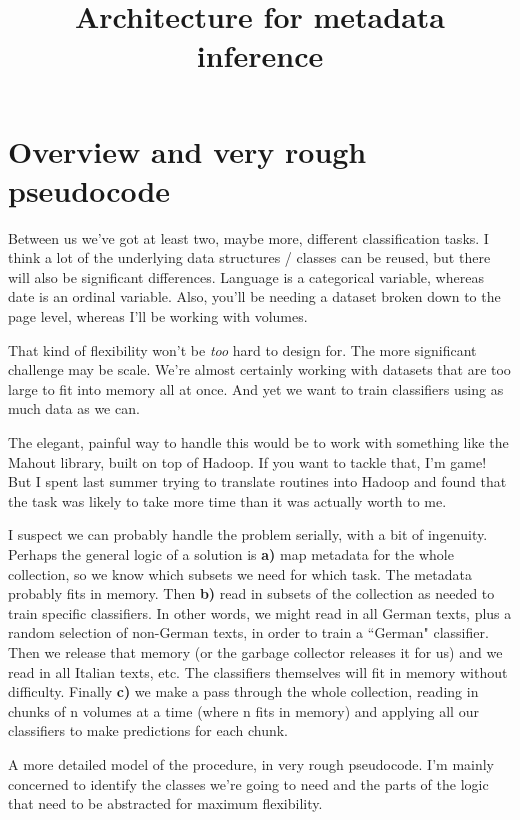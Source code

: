 \documentclass[12pt]{article}
\title{Architecture for metadata inference}
\author{}
\begin{document}
\maketitle

\section{Overview and very rough pseudocode}

Between us we've got at least two, maybe more, different classification tasks. I think a lot of the underlying data structures / classes can be reused, but there will also be significant differences. Language is a categorical variable, whereas date is an ordinal variable. Also, you'll be needing a dataset broken down to the page level, whereas I'll be working with volumes.

That kind of flexibility won't be \emph{too} hard to design for. The more significant challenge may be scale. We're almost certainly working with datasets that are too large to fit into memory all at once. And yet we want to train classifiers using as much data as we can.

The elegant, painful way to handle this would be to work with something like the Mahout library, built on top of Hadoop. If you want to tackle that, I'm game! But I spent last summer trying to translate routines into Hadoop and found that the task was likely to take more time than it was actually worth to me.

I suspect we can probably handle the problem serially, with a bit of ingenuity. Perhaps the general logic of a solution is \textbf{a)} map metadata for the whole collection, so we know which subsets we need for which task. The metadata probably fits in memory. Then \textbf{b)} read in subsets of the collection as needed to train specific classifiers. In other words, we might read in all German texts, plus a random selection of non-German texts, in order to train a ``German" classifier. Then we release that memory (or the garbage collector releases it for us) and we read in all Italian texts, etc. The classifiers themselves will fit in memory without difficulty. Finally \textbf{c)} we make a pass through the whole collection, reading in chunks of n volumes at a time (where n fits in memory) and applying all our classifiers to make predictions for each chunk.

A more detailed model of the procedure, in very rough pseudocode. I'm mainly concerned to identify the classes we're going to need and the parts of the logic that need to be abstracted for maximum flexibility.
\end{document}
